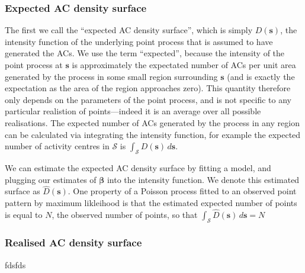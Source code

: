 \documentclass[useAMS,usenatbib,referee]{biom}
\begin{document}
\subsubsection{Expected AC density surface}

The first we call the ``expected AC density surface'', which is simply $D(\bm{s})$, the intensity function of the underlying point process that is assumed to have generated the ACs. We use the term ``expected'', because the intensity of the point process at $\bm{s}$ is approximately the expectated number of ACs per unit area generated by the process in some small region surrounding $\bm{s}$ (and is exactly the expectation as the area of the region approaches zero). This quantity therefore only depends on the parameters of the point process, and is not specific to any particular realistion of points---indeed it is an average over all possible realisations. The expected number of ACs generated by the process in any region can be calculated via integrating the intensity function, for example the expected number of activity centres in $\mathcal{S}$ is $\int_{\mathcal{S}} D(\bm{s}) \, d\bm{s}$.

We can estimate the expected AC density surface by fitting a model,
and plugging our estimates of $\bm{\beta}$ into the intensity
function. We denote this estimated surface as
$\widehat{D}(\bm{s})$. One property of a Poisson process fitted to
an observed point pattern by maximum likleihood is that the estimated expected number of
points is equal to $N$, the observed number of points, so that
$\int_{\mathcal{S}} \widehat{D}(\bm{s}) \, d\bm{s} = N$

\subsubsection{Realised AC density surface} 
fdsfds

 
\end{document}
